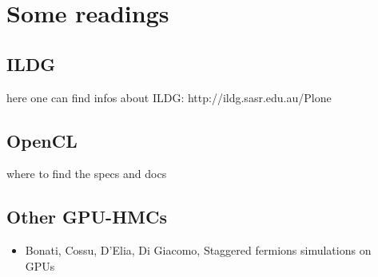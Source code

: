 \documentclass[a4paper,11pt]{article}
\begin{document}
\section{Some readings}
\subsection{ILDG}
here one can find infos about ILDG: http://ildg.sasr.edu.au/Plone
\subsection{OpenCL}
where to find the specs and docs
\subsection{Other GPU-HMCs}
\begin{itemize}
\item Bonati, Cossu, D'Elia, Di Giacomo, Staggered fermions simulations on GPUs~\cite{Bonati:2010qu}
\end{itemize}



\end{document}
